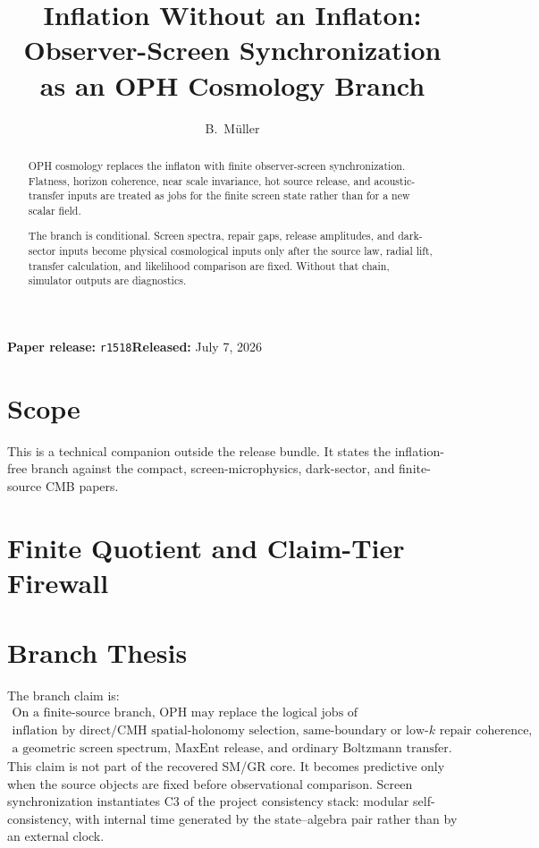 \documentclass[11pt]{article}
\title{Inflation Without an Inflaton:\\
Observer-Screen Synchronization as an OPH Cosmology Branch}
\author{B.\ M\"uller}
\date{\OPHPaperReleaseDate}
\newcommand{\OPHPaperReleaseID}{r1518}
\newcommand{\OPHPaperReleaseDate}{July 7, 2026}
\newcommand{\OPHPaperReleaseBanner}{%
      \begin{center}
      \small\textbf{Paper release:} \texttt{\OPHPaperReleaseID}\quad\textbf{Released:} \OPHPaperReleaseDate
      \end{center}}
\theoremstyle{remark}
\theoremstyle{plain}
\begin{document}
\maketitle
\OPHPaperReleaseBanner

\begin{abstract}
OPH cosmology replaces the inflaton with finite observer-screen
synchronization. Flatness, horizon coherence, near scale invariance, hot source
release, and acoustic-transfer inputs are treated as jobs for the finite screen
state rather than for a new scalar field.

The branch is conditional. Screen spectra, repair gaps, release amplitudes, and
dark-sector inputs become physical cosmological inputs only after the source
law, radial lift, transfer calculation, and likelihood comparison are fixed.
Without that chain, simulator outputs are diagnostics.
\end{abstract}

\section{Scope}

This is a technical companion outside the release bundle. It states the
inflation-free branch against the compact, screen-microphysics, dark-sector,
and finite-source CMB papers.

\section{Finite Quotient and Claim-Tier Firewall}





\section{Branch Thesis}

The branch claim is:
\[
\boxed{
\begin{gathered}
\text{On a finite-source branch, OPH may replace the logical jobs of}\\
\text{inflation by direct/CMH spatial-holonomy selection, same-boundary or low-}k\text{ repair coherence,}\\
\text{a geometric screen spectrum, MaxEnt release, and ordinary Boltzmann transfer.}
\end{gathered}}
\]
This claim is not part of the recovered SM/GR core.  It becomes predictive only when the source
objects are fixed before observational comparison.
Screen synchronization instantiates C3 of the project consistency stack:
modular self-consistency, with internal time generated by the state--algebra
pair rather than by an external clock.
\end{document}

